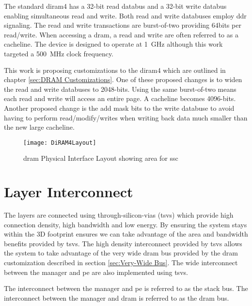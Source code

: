 The standard \ac{diram4} has a 32-bit read databus and a 32-bit write databus enabling simultaneous read and write. Both read and write databuses employ \ac{ddr} signaling.
The read and write transactions are burst-of-two providing 64bits per read/write. When accessing a \ac{dram}, a read and write are often referred to as a cacheline.
The device is designed to operate at \SI[per-mode=symbol]{1}{\giga\hertz} although this work targeted a \SI[per-mode=symbol]{500}{\mega\hertz} clock frequency.

This work is proposing customizations to the \ac{diram4} which are outlined in chapter \ref{sec:DRAM Customizations}. One of these proposed changes is to widen the read and write databuses to 2048-bits.
Using the same burst-of-two means each read and write will access an entire page. A cacheline becomes 4096-bits.
Another proposed change is the add mask bits to the write databuse to avoid having to perform read/modify/writes when writing back data much smaller than the new large cacheline.

\begin{figure}[!t]
\centering
\captionsetup{justification=centering}
\captionsetup{width=.9\linewidth}
\centerline{
\mbox{\texttt{[image: DiRAM4Layout]}}
}
\caption{\ac{dram} Physical Interface Layout showing area for \ac{ssc}}
\label{fig:diram4Layout}
\end{figure}


\section{Layer Interconnect}
\label{sec:Layer Interconnect}

The layers are connected using through-silicon-vias (\ac{tsv}s) which provide high connection density, high bandwidth and low energy.
By ensuring the system stays within the 3D footprint ensures we can take advantage of the area and bandwidth benefits provided by \acp{tsv}.
The high density interconnect provided by \acp{tsv} allows the system to take advantage of the very wide \ac{dram} bus provided by the \ac{dram} customization described in section \ref{sec:Very-Wide Bus}.
The wide interconnect between the manager and \ac{pe} are also implemented using \acp{tsv}.

The interconnect between the manager and \ac{pe} is referred to as the stack bus. The interconnect between the manager and \ac{dram} is referred to as the \ac{dram} bus.

